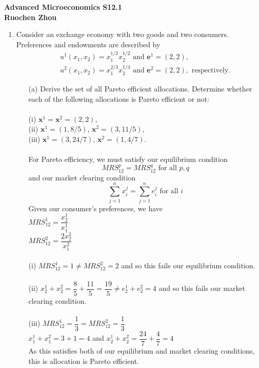 \documentclass[11pt]{article}
\begin{document}
\begin{center}
\textbf{Advanced Microeconomics S12.1\\}
\textbf{Ruochen Zhou}
\end{center}

\begin{enumerate}
\item Consider an exchange economy with two goods and two consumers. Preferences and endowments are described by
 	\begin{eqnarray*}
	&&u^{1}(x_{1},x_{2})	=x_{1}^{1/2}x_{2}^{1/2}\text{ and }\mathbf{e}^{1}=(2,2),\\
	&& u^{2}(x_{1},x_{2})=x_{1}^{2/3}x_{2}^{1/3}\text{ and }\mathbf{e}^{2}=(2,2),\text{ respectively.}
	\end{eqnarray*}
	\begin{itemize}
	\item[(a)] Derive the set of all Pareto efficient allocations. Determine whether each of the following allocations is Pareto efficient or not:\\\\
	(i) $\mathbf{x}^{1}=\mathbf{x}^{2}=(2,2)$,\\
	(ii) $\mathbf{x}^{1}=(1,8/5)$, $\mathbf{x}^{2}=(3,11/5)$,\\
	(iii) $\mathbf{x}^{1}=(3,24/7)$, $\mathbf{x}^{2}=(1,4/7)$.
	\smallskip\\\\
	For Pareto efficiency, we must satisfy our equilibrium condition
	$$MRS_{12}^p=MRS_{12}^q\text{ for all }p,q$$
	and our market clearing condition
	$$\sum_{j=1}^nx_i^j=\sum_{j=1}^ne_i^j\text{ for all }i$$
	Given our consumer's preferences, we have\\
	$MRS_{12}^1=\dfrac{x_2^1}{x_1^1}$\\
	$MRS_{12}^2=\dfrac{2x_2^2}{x_1^2}$\\\\
	(i) $MRS_{12}^1=1\neq MRS_{12}^2=2$ and so this fails our equilibrium condition.\\\\
	(ii) $x_2^1+x_2^2=\dfrac{8}{5}+\dfrac{11}{5}=\dfrac{19}{5}\neq e_2^1+e_2^2=4$ and so this fails our market clearing condition.\\\\
	(iii) $MRS_{12}^1=\dfrac{1}{3}=MRS_{12}^2=\dfrac{1}{3}$\\
	$x_1^1+x_1^2=3+1=4$ and $x_2^1+x_2^2=\dfrac{24}{7}+\dfrac{4}{7}=4$\\
	As this satisfies both of our equilibrium and market clearing conditions, this is allocation is Pareto efficient.\\\\

\end{itemize}
\end{enumerate}
\end{document}

